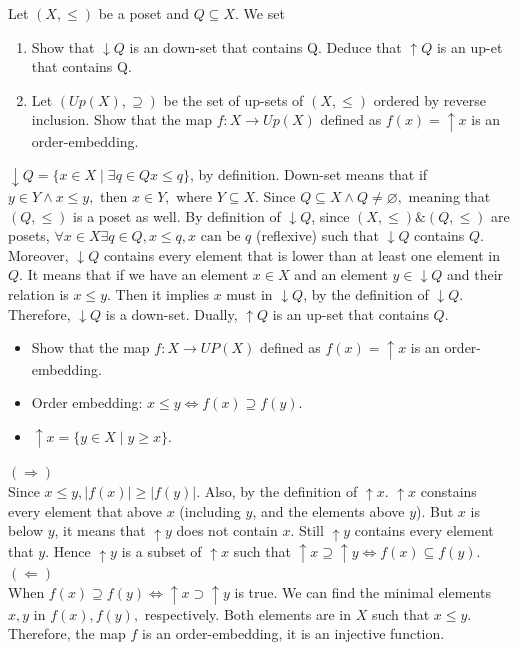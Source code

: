 \documentclass[11pt,a4paper]{exam}
\renewcommand{\emptyset}{\varnothing}
\begin{document}
\begin{exo}
    Let $(X, \leq)$ be a poset and $Q \subseteq X$. We set 
    \begin{enumerate}
        \item Show that $\downarrow Q$ is an down-set that contains Q. Deduce that $\uparrow Q$ is an up-et that contains Q.
        \item Let $(Up(X), \supseteq)$ be the set of up-sets of $(X, \leq)$ ordered by reverse inclusion. Show that the map $f \colon X \rightarrow Up(X)$ defined as $f(x) = \uparrow x$ is an order-embedding.
    \end{enumerate}

    \begin{sol}
        $\downarrow Q = \{x \in X \mid \exists q \in Q x \leq q\}$, by definition. Down-set means that if $y \in Y \land x \leq y,$ then $x \in Y,$ where $Y \subseteq X$. Since $Q \subseteq X \land Q \neq \emptyset,$ meaning that $(Q, \leq)$ is a poset as well.
        By definition of $\downarrow Q$, since $(X, \leq) \& (Q, \leq)$ are posets, $\forall x \in X \exists q \in Q, x \leq q, x \text{ can be } q$ (reflexive) such that $\downarrow Q$ contains $Q$. Moreover, $\downarrow Q$ contains every element that is lower than at least one element in $Q$. It means that if we have an element $x \in X$ and an element $y \in \downarrow Q$ and their relation is $x \leq y$. Then it implies $x$ must in $\downarrow Q$, by the definition of $\downarrow Q$. Therefore, $\downarrow Q$ is a down-set. Dually, $\uparrow Q$ is an up-set that contains $Q$.\\ 
        \begin{itemize}
            \item Show that the map $f \colon X \rightarrow UP(X)$ defined as $f(x) = \uparrow x$ is an order-embedding.
            \item Order embedding: $x \leq y \Leftrightarrow f(x) \supseteq f(y)$.
            \item $\uparrow x = \{y \in X \mid y \geq x\}$.
        \end{itemize} 
        $(\Rightarrow)$ \\
        Since $x \leq y, \vert f(x) \vert \geq \vert f(y) \vert$. Also, by the definition of $\uparrow x$. $\uparrow x$ constains every element that above $x$ (including $y$, and the elements above $y$). But $x$ is below $y$, it means that $\uparrow y$ does not contain $x$. Still $\uparrow y$ contains every element that $y$. Hence $\uparrow y$ is a subset of $\uparrow x$ such that $\uparrow x \supseteq \uparrow y \Leftrightarrow f(x) \subseteq f(y)$. \\ 
        $(\Leftarrow)$ \\ 
        When $f(x) \supseteq f(y) \Leftrightarrow \uparrow x \supset \uparrow y$ is true. We can find the minimal elements $x, y \text{ in } f(x), f(y),$ respectively. Both elements are in $X$ such that $x \leq y$. Therefore, the map $f$ is an order-embedding, it is an injective function. 
    \end{sol}
\end{exo}
\end{document}
